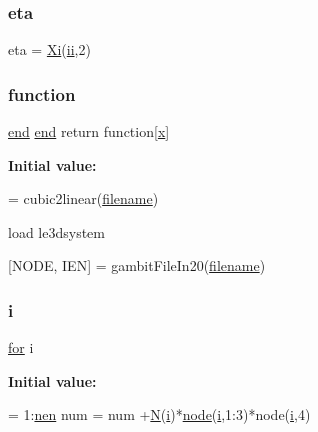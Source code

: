 \subsubsection{\texorpdfstring{eta}{eta}}
{\footnotesize\ttfamily eta = \hyperlink{a00605_a34d6ec2e729af94d4261c2243a358e05}{Xi}(\hyperlink{a00605_abf9d47cd7d4fbc942e618bb1977019c2}{ii},2)}

\mbox{\label{a00605_a0de0569134ddb1d040c23e040474da9a}} 
\subsubsection{\texorpdfstring{function}{function}}
{\footnotesize\ttfamily \hyperlink{a00608_afb358f48b1646c750fb9da6c6585be2b}{end} \hyperlink{a00608_afb358f48b1646c750fb9da6c6585be2b}{end} return function\mbox{[}\hyperlink{a00605_ac98c3bb25378222646e977292011625f}{x}\mbox{]}}

{\bfseries Initial value\+:}
\begin{DoxyCode}
= cubic2linear(\hyperlink{a00623_a42a21beb8018ac623f4d09db1343b9cf}{filename})

load le3dsystem

[NODE, IEN] = gambitFileIn20(\hyperlink{a00623_a42a21beb8018ac623f4d09db1343b9cf}{filename})
\end{DoxyCode}
\mbox{\label{a00605_a6f6ccfcf58b31cb6412107d9d5281426}} 
\subsubsection{\texorpdfstring{i}{i}}
{\footnotesize\ttfamily \hyperlink{a00623_ad1e7380d51df1e0043d24d3c8a860e0a}{for} i}

{\bfseries Initial value\+:}
\begin{DoxyCode}
= 1:\hyperlink{a00605_acbbc42389c3587d1280ad7f1322035ba}{nen}
    num = num +\hyperlink{a00605_a8cc2e7240164328fdc3f0e5e21032c56}{N}(\hyperlink{a00605_a6f6ccfcf58b31cb6412107d9d5281426}{i})*\hyperlink{a00611_adf51fe9945b6ca147057cc27ff639d0f}{node}(\hyperlink{a00605_a6f6ccfcf58b31cb6412107d9d5281426}{i},1:3)*node(\hyperlink{a00605_a6f6ccfcf58b31cb6412107d9d5281426}{i},4)
\end{DoxyCode}
\mbox{\label{a00605_a094c367727273b4da2b960ca3b3edc06}} 

